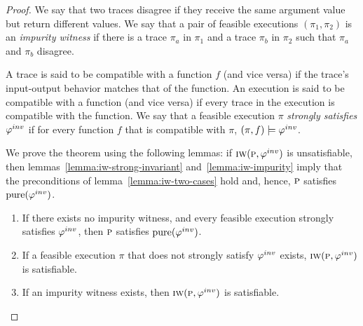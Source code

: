 \begin{proof}

We say that two traces disagree if they receive the same argument value but return different values.
We say that a pair of feasible executions $(\pi_1, \pi_2)$ is an \emph{impurity witness} if there is a trace
$\pi_a$ in $\pi_1$ and a trace $\pi_b$ in $\pi_2$ such that $\pi_a$ and $\pi_b$ disagree.

A trace is said to be compatible with a function $f$ (and vice versa) if the trace's input-output behavior matches that of the function.
An execution is said to be compatible with a function (and vice versa) if every trace in the execution is compatible with the function.
We say that a feasible execution $\pi$ \emph{strongly satisfies} $\varphi^{inv}$ if for every function $f$ that is compatible with $\pi$, $(\pi,f) \models \varphi^{inv}$.

We prove the theorem using the following lemmas:
if $\textsc{iw}(\textsc{p}, \varphi^{inv})$ is unsatisfiable, then lemmas~\ref{lemma:iw-strong-invariant} and~\ref{lemma:iw-impurity} imply
that the preconditions of lemma~\ref{lemma:iw-two-cases} hold and, hence, $\textsc{p}$ satisfies $\mathrm{pure}(\varphi^{inv})$.
\begin{enumerate}
\item \label{lemma:iw-two-cases}
If there exists no impurity witness, and every feasible execution strongly satisfies $\varphi^{inv}$, then $\textsc{p}$ satisfies $\mathrm{pure}(\varphi^{inv})$.

\item \label{lemma:iw-strong-invariant}
If a feasible execution $\pi$ that does not strongly satisfy $\varphi^{inv}$ exists, $\textsc{iw}(\textsc{p}, \varphi^{inv})$ is satisfiable.

\item \label{lemma:iw-impurity}
If an impurity witness exists, then $\textsc{iw}(\textsc{p}, \varphi^{inv})$ is satisfiable.
\end{enumerate}




\end{proof}
